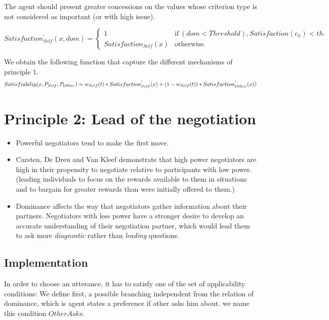 \documentclass{article}
\begin{document}
	The agent should present greater concessions on the values whose criterion type is not considered as important (or with high issue).
	
	$$Satisfaction^{'}_{Self} (x,dom) = \left\{\begin{array}{ll}
	1 & \mathrm{if\ }(dom< Threshold) , Satisfaction(c_x) < th.\\
	Satisfaction_{Self}(x) & \mathrm{otherwise}.
	\end{array}\right.$$
	
	We obtain the following function that capture the different mechanisms of principle 1. 
	\begin{dmath}
	$$Satisfiabiliy(x,P_{Self},P_{Other}) = w_{Self}(t) * Satisfaction^{'}_{Self}(x) + (1 - w_{Self}(t)) * Satisfaction^{'}_{Other}(x))$$
	\end{dmath}



	\section{Principle 2: Lead of the negotiation}
%	
	
	\begin{itemize}
		\item Powerful negotiators tend to make the first move. %
	
		\item Carsten, De Dreu and Van Kleef demonstrate that high power negotiators are high in their propensity to negotiate relative to participants with low power. (leading individuals to focus on the rewards available to them in situations and to bargain for	greater rewards than were initially offered to them.)
	
		\item Dominance affects the way that negotiators gather information about their partners. Negotiators with less power have a stronger desire to develop an accurate understanding of their negotiation partner, which would lead them to ask more \emph{diagnostic} rather than \emph{leading} questions.
		
	\end{itemize} 
	
	\subsection{Implementation}
	In order to choose an utterance, it has to satisfy one of the set of applicability conditions:
	We define first, a possible branching independent from the relation of dominance, which is agent states a preference if other asks him about. we name this condition $OtherAsks$.
	
\end{document}
